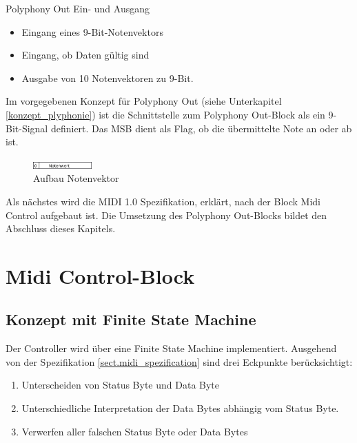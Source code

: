 Polyphony Out Ein- und Ausgang

\begin{itemize}
	\item Eingang eines 9-Bit-Notenvektors
    \item Eingang, ob Daten gültig sind
	\item Ausgabe von 10 Notenvektoren zu 9-Bit.
\end{itemize}
\bigskip

Im vorgegebenen Konzept für Polyphony Out (siehe Unterkapitel \ref{konzept_plyphonie}) ist die Schnittstelle zum Polyphony Out-Block als ein 9-Bit-Signal definiert. Das MSB dient als Flag, ob die übermittelte Note an oder ab ist.

\begin{figure}[H]
	\includegraphics[width=0.2\textwidth]{images/midi_interface/NotenVektor.png}
	\caption{Aufbau Notenvektor}
	\label{fig.Notenvektor}
\end{figure}

Als nächstes wird die MIDI 1.0 Spezifikation, erklärt, nach der Block Midi Control aufgebaut ist. Die Umsetzung des Polyphony Out-Blocks bildet den Abschluss dieses Kapitels.




\newpage
\section{Midi Control-Block}\label{sect.midi_umsetzung}

\subsection{Konzept mit Finite State Machine}\label{anforderung_fsm}

Der Controller wird über eine Finite State Machine implementiert. Ausgehend von der Spezifikation \ref{sect.midi_spezification} sind drei Eckpunkte berücksichtigt:

\begin{enumerate}
	\item Unterscheiden von Status Byte und Data Byte
	\item Unterschiedliche Interpretation der Data Bytes abhängig vom Status Byte.
	\item Verwerfen aller falschen Status Byte oder Data Bytes
\end{enumerate}

